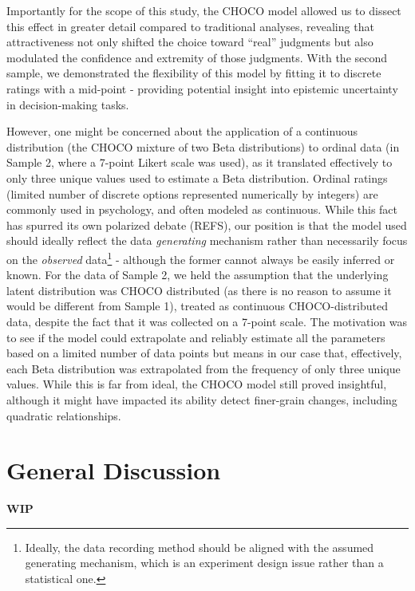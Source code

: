 \documentclass[
  jou,
  floatsintext,
  longtable,
  nolmodern,
  notxfonts,
  notimes,
  colorlinks=true,linkcolor=blue,citecolor=blue,urlcolor=blue]{apa7}
\begin{document}
Importantly for the scope of this study, the CHOCO model allowed us to
dissect this effect in greater detail compared to traditional analyses,
revealing that attractiveness not only shifted the choice toward
``real'' judgments but also modulated the confidence and extremity of
those judgments. With the second sample, we demonstrated the flexibility
of this model by fitting it to discrete ratings with a mid-point -
providing potential insight into epistemic uncertainty in
decision-making tasks.

However, one might be concerned about the application of a continuous
distribution (the CHOCO mixture of two Beta distributions) to ordinal
data (in Sample 2, where a 7-point Likert scale was used), as it
translated effectively to only three unique values used to estimate a
Beta distribution. Ordinal ratings (limited number of discrete options
represented numerically by integers) are commonly used in psychology,
and often modeled as continuous. While this fact has spurred its own
polarized debate (REFS), our position is that the model used should
ideally reflect the data \emph{generating} mechanism rather than
necessarily focus on the \emph{observed} data\footnote{Ideally, the data
  recording method should be aligned with the assumed generating
  mechanism, which is an experiment design issue rather than a
  statistical one.} - although the former cannot always be easily
inferred or known. For the data of Sample 2, we held the assumption that
the underlying latent distribution was CHOCO distributed (as there is no
reason to assume it would be different from Sample 1), treated as
continuous CHOCO-distributed data, despite the fact that it was
collected on a 7-point scale. The motivation was to see if the model
could extrapolate and reliably estimate all the parameters based on a
limited number of data points but means in our case that, effectively,
each Beta distribution was extrapolated from the frequency of only three
unique values. While this is far from ideal, the CHOCO model still
proved insightful, although it might have impacted its ability detect
finer-grain changes, including quadratic relationships.

\section{General Discussion}\label{general-discussion}

\textbf{WIP}
\end{document}
